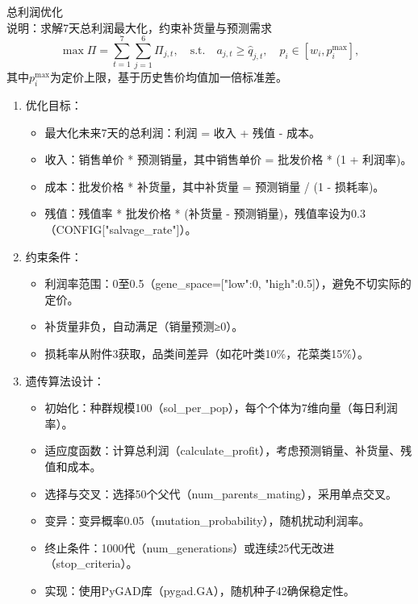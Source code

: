 \documentclass{cumcmthesis} %
\begin{document}
总利润优化 \\
   说明：求解7天总利润最大化，约束补货量与预测需求
   \begin{equation}
   \max \Pi = \sum_{t=1}^7 \sum_{j=1}^6 \Pi_{j,t}, \quad \text{s.t.} \quad a_{j,t} \geq \hat{q}_{j,t}, \quad p_i \in [w_i, p_i^{\text{max}}],
   \end{equation}
   其中$p_i^{\text{max}}$为定价上限，基于历史售价均值加一倍标准差。

   \begin{enumerate}
    \item 优化目标：
    \begin{itemize}
        \item 最大化未来7天的总利润：利润 = 收入 + 残值 - 成本。
        \item 收入：销售单价 * 预测销量，其中销售单价 = 批发价格 * (1 + 利润率)。
        \item 成本：批发价格 * 补货量，其中补货量 = 预测销量 / (1 - 损耗率)。
        \item 残值：残值率 * 批发价格 * (补货量 - 预测销量)，残值率设为0.3（CONFIG["salvage\_rate"]）。
    \end{itemize}   
    
    \item 约束条件：
    \begin{itemize}
        \item 利润率范围：0至0.5（gene\_space=[{"low":0, "high":0.5}]），避免不切实际的定价。
        \item 补货量非负，自动满足（销量预测≥0）。
        \item 损耗率从附件3获取，品类间差异（如花叶类10\%，花菜类15\%）。
    \end{itemize}
    
    \item 遗传算法设计：
    \begin{itemize}
        \item 初始化：种群规模100（sol\_per\_pop），每个个体为7维向量（每日利润率）。
        \item 适应度函数：计算总利润（calculate\_profit），考虑预测销量、补货量、残值和成本。
        \item 选择与交叉：选择50个父代（num\_parents\_mating），采用单点交叉。
        \item 变异：变异概率0.05（mutation\_probability），随机扰动利润率。
        \item 终止条件：1000代（num\_generations）或连续25代无改进（stop\_criteria）。
        \item 实现：使用PyGAD库（pygad.GA），随机种子42确保稳定性。
    \end{itemize}
    

\end{enumerate}
\end{document}
